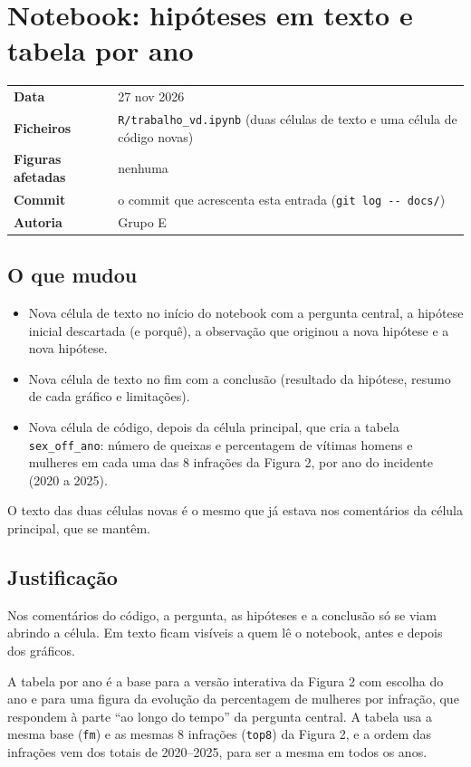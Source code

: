 \documentclass[11pt,a4paper]{article}
\makeatletter
\newcommand{\ficha}[5]{%
  \begin{center}
  \colorbox{fundo}{\begin{minipage}{0.95\linewidth}\small
  \begin{tabular}{@{}p{3.2cm}p{11.8cm}@{}}
  \textbf{Data} & #1\\
  \textbf{Ficheiros} & #2\\
  \textbf{Figuras afetadas} & #3\\
  \textbf{Commit} & #4\\
  \textbf{Autoria} & #5\\
  \end{tabular}
  \end{minipage}}
  \end{center}}
\makeatother
\begin{document}
\section{Notebook: hipóteses em texto e tabela por ano}

\ficha{27 nov 2026}
      {\texttt{R/trabalho\_vd.ipynb} (duas células de texto e uma célula de código novas)}
      {nenhuma}
      {o commit que acrescenta esta entrada (\texttt{git log -{}- docs/})}
      {Grupo E}

\subsection*{O que mudou}

\begin{itemize}
  \item Nova célula de texto no início do notebook com a pergunta central, a hipótese inicial
        descartada (e porquê), a observação que originou a nova hipótese e a nova hipótese.
  \item Nova célula de texto no fim com a conclusão (resultado da hipótese, resumo de cada
        gráfico e limitações).
  \item Nova célula de código, depois da célula principal, que cria a tabela
        \texttt{sex\_off\_ano}: número de queixas e percentagem de vítimas homens e mulheres
        em cada uma das 8 infrações da Figura 2, por ano do incidente (2020 a 2025).
\end{itemize}

O texto das duas células novas é o mesmo que já estava nos comentários da célula principal,
que se mantêm.

\subsection*{Justificação}

Nos comentários do código, a pergunta, as hipóteses e a conclusão só se viam abrindo a célula.
Em texto ficam visíveis a quem lê o notebook, antes e depois dos gráficos.

A tabela por ano é a base para a versão interativa da Figura 2 com escolha do ano e para uma
figura da evolução da percentagem de mulheres por infração, que respondem à parte ``ao longo do
tempo'' da pergunta central. A tabela usa a mesma base (\texttt{fm}) e as mesmas 8 infrações
(\texttt{top8}) da Figura 2, e a ordem das infrações vem dos totais de 2020--2025, para ser a
mesma em todos os anos.
\end{document}
